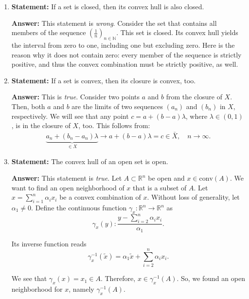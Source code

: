 \documentclass[fontsize=11pt, paper=a4]{scrartcl}
\begin{document}
\begin{enumerate}[label=(\alph*)]
    \item \textbf{Statement:} If a set is closed, then its convex hull is also closed.

    \textbf{Answer:} This statement is \emph{wrong}. Consider the set that contains all members of the sequence $(\frac{1}{n})_{n \in \mathbb N}$. This set is closed. Its convex hull yields the interval from zero to one, including one but excluding zero. Here is the reason why it does not contain zero: every member of the sequence is strictly positive, and thus the convex combination must be strictly positive, as well.

    \item \textbf{Statement:} If a set is convex, then its closure is convex, too.
    
    \textbf{Answer:} This is \emph{true}. Consider two points $a$ and $b$ from the closure of $X$. Then, both $a$ and $b$ are the limits of two sequences $(a_n)$ and $(b_n)$ in $X$, respectively. We will see that any point $c = a + (b-a) \lambda$, where $\lambda \in (0,1)$, is in the closure of $X$, too. This follows from:
    \begin{align*}
        \underbrace{a_n + (b_n - a_n) \lambda}_{\in X} \to a + (b - a) \lambda = c \in \bar X, \quad n \to \infty.
    \end{align*}

    \item \textbf{Statement:} The convex hull of an open set is open.

    \textbf{Answer:} This statement is \emph{true}. Let $A \subset \mathbb R^n$ be open and $x \in \mathrm{conv}(A)$. We want to find an open neighborhood of $x$ that is a subset of $A$. Let $x = \sum^n_{i=1}\alpha_i x_i$ be a convex combination of $x$. Without loss of generality, let $\alpha_1 \neq 0$. Define the continuous function $\gamma_x: \mathbb R^n \to \mathbb R^n$ as
    $$
        \gamma_x(y): \frac{y - \sum^n_{i=2} \alpha_i x_i}{\alpha_1}.
    $$

    Its inverse function reads
    $$
        \gamma_x^{-1}(\tilde x) = \alpha_1 \tilde x + \sum^n_{i=2}\alpha_ix_i.
    $$

    We see that $\gamma_x(x) = x_1 \in A$. Therefore, $x \in \gamma_x^{-1}(A)$. So, we found an open neighborhood for $x$, namely $\gamma_x^{-1}(A)$.
\end{enumerate}


\end{document}
